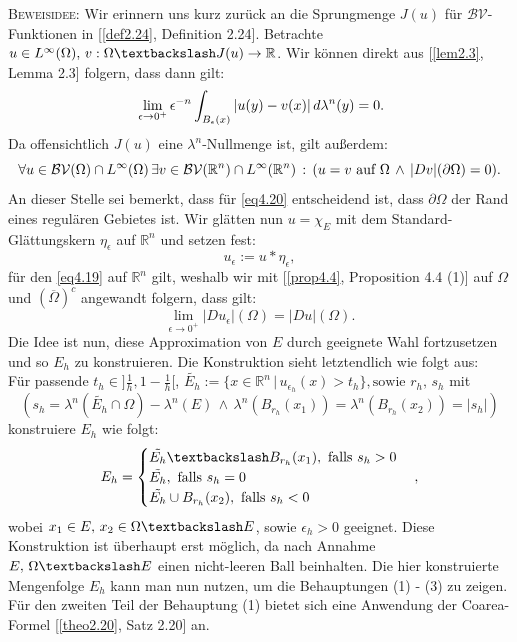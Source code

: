 \textsc{Beweisidee:} Wir erinnern uns kurz zurück an die Sprungmenge \(J(u)\) für \(\mathcal{BV}\)-Funktionen in [\ref{def2.24}, Definition 2.24]. Betrachte \(u \in L^{\infty}(\Omega), \, v : \Omega \textbackslash J(u) \to \mathbb{R}\). Wir können direkt aus [\ref{lem2.3}, Lemma 2.3] folgern, dass dann gilt:
\begin{equation}{\label{eq4.19}}
    \lim_{\epsilon \to 0^+} \epsilon^{-n} \int_{B_{\epsilon}(x)} |u(y) - v(x)| \, d\lambda^n(y) = 0.
\end{equation}
Da offensichtlich \(J(u)\) eine \(\lambda^n\)-Nullmenge ist, gilt außerdem:
\begin{equation}{\label{eq4.20}}
    \forall u \in \mathcal{BV}(\Omega) \cap L^{\infty}(\Omega) \, \exists v \in \mathcal{BV}(\mathbb{R}^n) \cap L^{\infty}(\mathbb{R}^n) \, : \, (u = v \text{ auf } \Omega \, \land \, |Dv|(\partial \Omega) = 0).
\end{equation}
An dieser Stelle sei bemerkt, dass für \eqref{eq4.20} entscheidend ist, dass \(\partial \Omega\) der Rand eines regulären Gebietes ist. Wir glätten nun \(u=\chi_E\) mit dem Standard-Glättungskern \(\eta_{\epsilon}\) auf \(\mathbb{R}^n\) und setzen fest:
\begin{equation}
    u_{\epsilon} := u \ast \eta_{\epsilon},
\end{equation}
für den \eqref{eq4.19} auf \(\mathbb{R}^n\) gilt, weshalb wir mit [\ref{prop4.4}, Proposition 4.4 (1)] auf \(\Omega\) und \((\overline{\Omega})^c\) angewandt folgern, dass gilt:
\begin{equation}
    \lim_{\epsilon \to 0^+} |Du_{\epsilon}|(\Omega) = |Du|(\Omega).
\end{equation}
Die Idee ist nun, diese Approximation von \(E\) durch geeignete Wahl fortzusetzen und so \(E_h\) zu konstruieren. Die Konstruktion sieht letztendlich wie folgt aus:\\
Für passende \(t_h \in ]\frac{1}{h},1-\frac{1}{h}[\), \(\tilde{E_h} := \{x \in \mathbb{R}^n \, | \, u_{\epsilon_h}(x) > t_h\}, \text{sowie }r_h, \, s_h\) mit
\begin{equation}
    (s_h = \lambda^n(\tilde{E_h} \cap \Omega) - \lambda^n(E) \, \land \, \lambda^n(B_{r_h}(x_1)) = \lambda^n(B_{r_h}(x_2)) = |s_h|)
\end{equation}
konstruiere \(E_h\) wie folgt:
\begin{equation}
    E_h = \begin{cases}
        \tilde{E_h} \textbackslash B_{r_h}(x_1), \text{ falls }s_h > 0 \\
        \tilde{E_h}, \text{ falls }s_h = 0 \\
        \tilde{E_h} \cup B_{r_h}(x_2), \text{ falls }s_h < 0 \\
    \end{cases},
\end{equation}
wobei \(x_1 \in E, \, x_2 \in \Omega \textbackslash E\), sowie \(\epsilon_h > 0\) geeignet. Diese Konstruktion ist überhaupt erst möglich, da nach Annahme \(E, \, \Omega \textbackslash E\) einen nicht-leeren Ball beinhalten. Die hier konstruierte Mengenfolge \(E_h\) kann man nun nutzen, um die Behauptungen (1) - (3) zu zeigen. Für den zweiten Teil der Behauptung (1) bietet sich eine Anwendung der Coarea-Formel [\ref{theo2.20}, Satz 2.20] an. \QEDB

